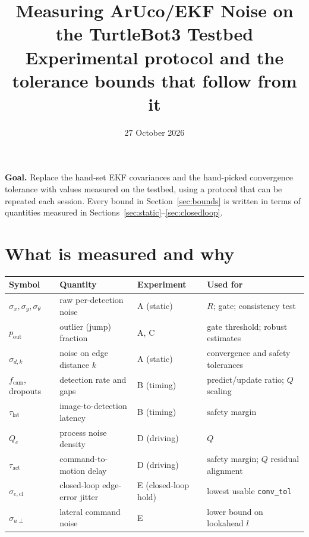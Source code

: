 \documentclass[11pt,a4paper]{article}
\title{\textbf{Measuring ArUco/EKF Noise on the TurtleBot3 Testbed}\\[0.3em]
\large Experimental protocol and the tolerance bounds that follow from it}
\author{}
\date{27 October 2026}
\begin{document}
\maketitle

\begin{notebox}
\textbf{Goal.} Replace the hand-set EKF covariances and the hand-picked
convergence tolerance with values measured on the testbed, using a
protocol that can be repeated each session. Every bound in
Section~\ref{sec:bounds} is written in terms of quantities measured in
Sections~\ref{sec:static}--\ref{sec:closedloop}.
\end{notebox}

\tableofcontents

\section{What is measured and why}

\begin{center}
\small
\begin{tabularx}{\textwidth}{@{}l l l X@{}}
\toprule
Symbol & Quantity & Experiment & Used for \\
\midrule
$\sigma_x,\sigma_y,\sigma_\theta$ & raw per-detection noise & A (static) & $R$; gate; consistency test \\
$p_\text{out}$ & outlier (jump) fraction & A, C & gate threshold; robust estimates \\
$\sigma_{d,k}$ & noise on edge distance $k$ & A (static) & convergence and safety tolerances \\
$f_\text{cam}$, dropouts & detection rate and gaps & B (timing) & predict/update ratio; $Q$ scaling \\
$\tau_\text{lat}$ & image-to-detection latency & B (timing) & safety margin \\
$Q_c$ & process noise density & D (driving) & $Q$ \\
$\tau_\text{act}$ & command-to-motion delay & D (driving) & safety margin; $Q$ residual alignment \\
$\sigma_{e,\text{cl}}$ & closed-loop edge-error jitter & E (closed-loop hold) & lowest usable \texttt{conv\_tol} \\
$\sigma_{u\perp}$ & lateral command noise & E & lower bound on lookahead $l$ \\
\bottomrule
\end{tabularx}
\end{center}
\end{document}
